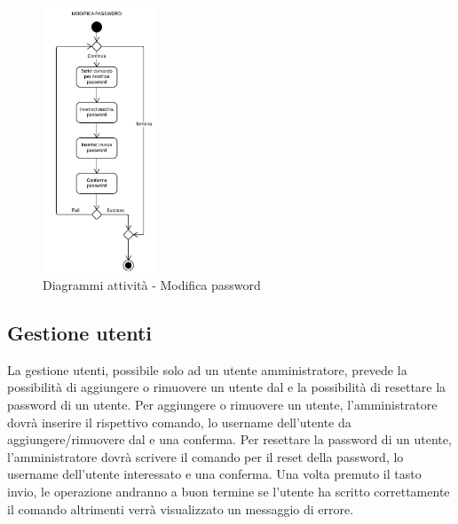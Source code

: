 \documentclass{scalatekids-article}
\begin{document}
\begin{figure}[H]
  \begin{center}
    \includegraphics[width=0.3\textwidth, keepaspectratio]{img/diagrammiAttivita/modificaPsw.jpeg}
    \caption{Diagrammi attività - Modifica password}
  \end{center}
\end{figure}

\subsection{Gestione utenti}

La gestione utenti, possibile solo ad un utente amministratore, prevede la
possibilità di aggiungere o rimuovere un utente dal  e la possibilità
di resettare la password di un utente. Per aggiungere o rimuovere un utente,
l'amministratore dovrà inserire il rispettivo comando, lo username dell'utente
da aggiungere/rimuovere dal  e una conferma. Per resettare la password
di un utente, l'amministratore dovrà scrivere il comando per il reset della
password, lo username dell'utente interessato e una conferma. Una volta
premuto il tasto invio, le operazione andranno a buon termine se l'utente ha
scritto correttamente il comando altrimenti verrà visualizzato un messaggio di
errore.
\end{document}
